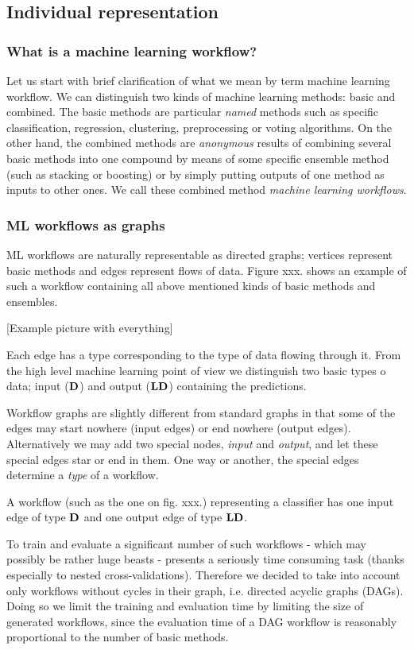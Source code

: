 \documentclass[a4paper,oneside]{memoir}
\begin{document}
\subsection{Individual representation}

\subsubsection{What is a machine learning workflow?}
Let us start with brief clarification of what we mean by term machine learning workflow. We can distinguish two kinds of machine learning methods: basic and combined. The basic methods are particular \textit{named} methods such as specific classification, regression, clustering, preprocessing or voting algorithms. On the other hand, the combined methods are \textit{anonymous} results of combining several basic methods into one compound by means of some specific ensemble method (such as stacking or boosting) or by simply putting outputs of one method as inputs to other ones. We call these combined method \textit{machine learning workflows}.

\subsubsection{ML workflows as graphs}
ML workflows are naturally representable as directed graphs; vertices represent basic methods and edges represent flows of data.
Figure xxx. shows an example of such a workflow containing all above mentioned kinds of basic methods and ensembles.

[Example picture with everything]

Each edge has a type corresponding to the type of data flowing through it. 
From the high level machine learning point of view we distinguish two basic types o data;
input \Dlong ($\textbf{D}$) and output \LDlong ($\textbf{LD}$) containing the predictions.

Workflow graphs are slightly different from standard graphs in that some of the edges may start nowhere (input edges) or end nowhere (output edges). 
Alternatively we may add two special nodes, \textit{input} and \textit{output}, and let these special edges star or end in them.
One way or another, the special edges determine a \textit{type} of a workflow.

A workflow (such as the one on fig. xxx.) representing a classifier has one input edge of type $\textbf{D}$ and one output edge of type $\textbf{LD}$.

To train and evaluate a significant number of such workflows - which may possibly be rather huge beasts -  presents a seriously time consuming task (thanks especially to nested cross-validations). Therefore we decided to take into account only workflows without cycles in their graph, i.e. directed acyclic graphs (DAGs). Doing so we limit the training and evaluation time by limiting the size of generated workflows, since the evaluation time of a DAG workflow is reasonably proportional to the number of basic methods.
\end{document}
